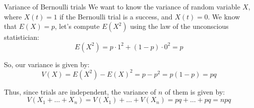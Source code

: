 \documentclass[a4paper]{article}
\begin{document}
\begin{parag}{Variance of Bernoulli trials}
    We want to know the variance of random variable $X$, where $X\left(t\right) = 1$ if the Bernoulli trial is a success, and $X\left(t\right) = 0$. We know that $E\left(X\right) = p$, let's compute $E\left(X^2\right)$ using the law of the unconscious statistician:
    \[E\left(X^2\right) = p\cdot 1^2 + \left(1 - p\right)\cdot 0^2 = p\]
    
    So, our variance is given by: 
    \[V\left(X\right) = E\left(X^2\right) - E\left(X\right)^2 = p - p^2 = p\left(1 - p\right) = pq\]

    Thus, since trials are independent, the variance of $n$ of them is given by: 
    \[V\left(X_1 + \ldots + X_n\right) = V\left(X_1\right) + \ldots + V\left(X_n\right) = pq + \ldots + pq = npq\]
\end{parag}
\end{document}
